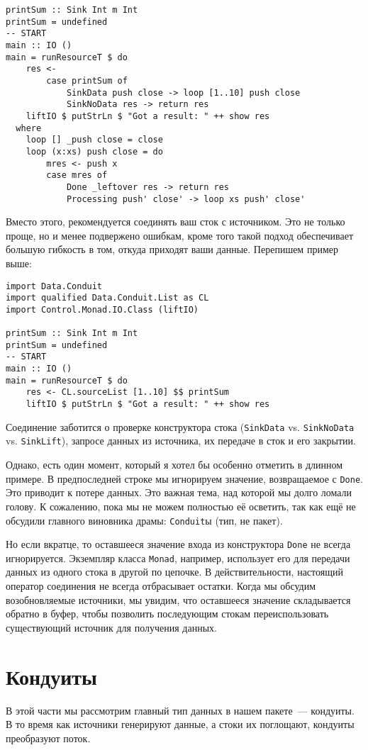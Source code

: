 {\begin{lstlisting}
printSum :: Sink Int m Int
printSum = undefined
-- START
main :: IO ()
main = runResourceT $ do
    res <-
        case printSum of
            SinkData push close -> loop [1..10] push close
            SinkNoData res -> return res
    liftIO $ putStrLn $ "Got a result: " ++ show res
  where
    loop [] _push close = close
    loop (x:xs) push close = do
        mres <- push x
        case mres of
            Done _leftover res -> return res
            Processing push' close' -> loop xs push' close'
\end{lstlisting}
Вместо этого, рекомендуется соединять ваш сток с источником. Это не только проще, 
но и менее подвержено ошибкам, кроме того такой подход обеспечивает большую гибкость в том, откуда приходят ваши данные.
Перепишем пример выше:
\begin{lstlisting}
import Data.Conduit
import qualified Data.Conduit.List as CL
import Control.Monad.IO.Class (liftIO)

printSum :: Sink Int m Int
printSum = undefined
-- START
main :: IO ()
main = runResourceT $ do
    res <- CL.sourceList [1..10] $$ printSum
    liftIO $ putStrLn $ "Got a result: " ++ show res
\end{lstlisting}

Соединение заботится о проверке конструктора стока (\lstinline'SinkData' vs. 
\lstinline'SinkNoData' vs. \lstinline'SinkLift'), запросе данных из источника, их передаче
в сток и его закрытии.

Однако, есть один момент, который я хотел бы особенно отметить в длинном примере. В предпоследней строке
мы игнорируем значение, возвращаемое с \lstinline'Done'. Это приводит
к потере данных. Это важная тема, над которой мы долго ломали голову. К сожалению,
пока мы не можем полностью её осветить, так как ещё не обсудили главного виновника
драмы: \lstinline'Conduit'ы (тип, не пакет). 

Но если вкратце, то оставшееся значение входа из конструктора \lstinline{Done} не всегда игнорируется. Экземпляр класса \lstinline{Monad},
например, использует его для передачи данных из одного стока в другой по цепочке.
В действительности, настоящий оператор соединения не всегда отбрасывает остатки. Когда мы
обсудим возобновляемые источники, мы
увидим, что оставшееся значение складывается обратно в буфер, чтобы позволить последующим
стокам переиспользовать существующий источник для получения данных.

\section{Кондуиты}
В этой части мы рассмотрим главный тип данных в нашем пакете~--- кондуиты. В то время как
источники генерируют данные, а стоки их поглощают, кондуиты преобразуют поток.

}
